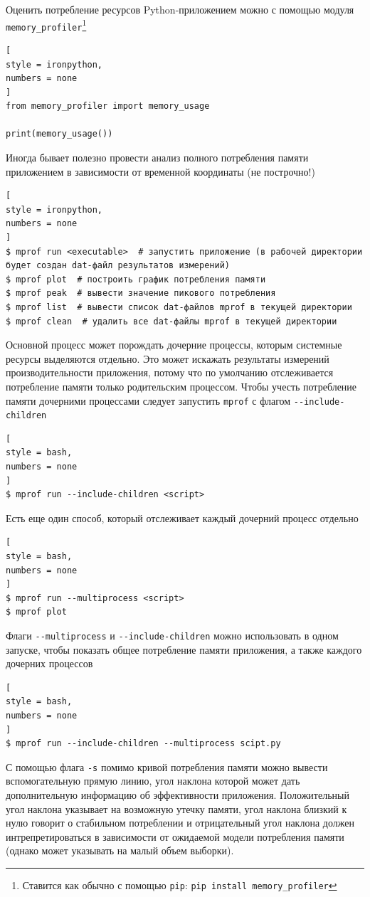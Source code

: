 \documentclass[%
	11pt,
	a4paper,
	utf8,
		]{article}
\begin{document}
Оценить потребление ресурсов Python-приложением можно с помощью модуля \texttt{memory\_profiler}\footnote{Ставится как обычно с помощью \texttt{pip}: \texttt{pip install memory\_profiler}}
\begin{lstlisting}[
style = ironpython,
numbers = none
]
from memory_profiler import memory_usage

print(memory_usage())
\end{lstlisting}

Иногда бывает полезно провести анализ полного потребления памяти приложением в зависимости от временной координаты (не построчно!)
\begin{lstlisting}[
style = ironpython,
numbers = none
]
$ mprof run <executable>  # запустить приложение (в рабочей директории будет создан dat-файл результатов измерений)
$ mprof plot  # построить график потребления памяти
$ mprof peak  # вывести значение пикового потребления
$ mprof list  # вывести список dat-файлов mprof в текущей директории
$ mprof clean  # удалить все dat-файлы mprof в текущей директории
\end{lstlisting}

Основной процесс может порождать дочерние процессы, которым системные ресурсы выделяются отдельно. Это может искажать результаты измерений производительности приложения, потому что по умолчанию отслеживается потребление памяти только родительским процессом. Чтобы учесть потребление памяти дочерними процессами следует запустить \texttt{mprof} с флагом \verb|--include-children|
\begin{lstlisting}[
style = bash,
numbers = none
]
$ mprof run --include-children <script>
\end{lstlisting}

Есть еще один способ, который отслеживает каждый дочерний процесс отдельно
\begin{lstlisting}[
style = bash,
numbers = none
]
$ mprof run --multiprocess <script>
$ mprof plot
\end{lstlisting}

Флаги \verb|--multiprocess| и \verb|--include-children| можно использовать в одном запуске, чтобы показать общее потребление памяти приложения, а также каждого дочерних процессов
\begin{lstlisting}[
style = bash,
numbers = none
]
$ mprof run --include-children --multiprocess scipt.py
\end{lstlisting}

С помощью флага \verb|-s| помимо кривой потребления памяти можно вывести вспомогательную прямую линию, угол наклона которой может дать дополнительную информацию об эффективности приложения. Положительный угол наклона указывает на возможную утечку памяти, угол наклона близкий к нулю говорит о стабильном потреблении и отрицательный угол наклона должен интрепретироваться в зависимости от ожидаемой модели потребления памяти (однако может указывать на малый объем выборки). 
\end{document}
